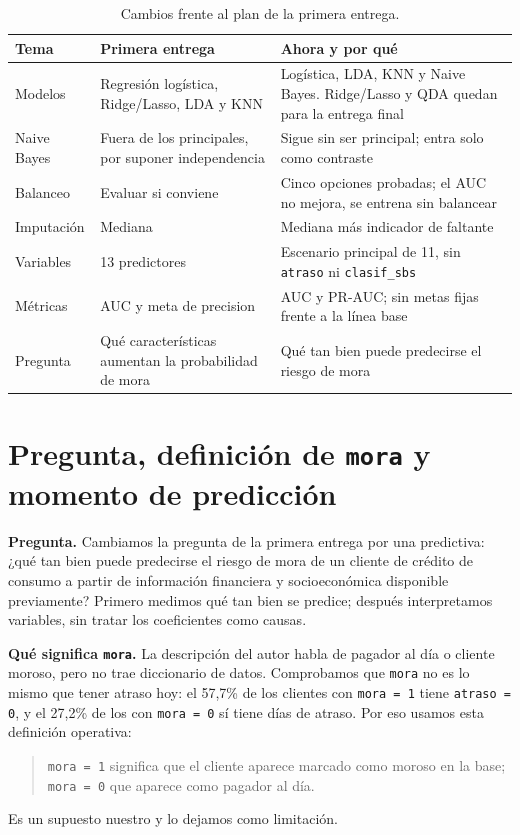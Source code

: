 \documentclass[11pt,a4paper]{article}
\begin{document}
\begin{table}[H]
  \centering
  \caption{Cambios frente al plan de la primera entrega.}
  \label{tab:cambios}
  \small
  \begin{tabular}{@{}p{2.2cm}p{4.2cm}p{6.8cm}@{}}
    \toprule
    Tema & Primera entrega & Ahora y por qué \\
    \midrule
    Modelos & Regresión logística, Ridge/Lasso, LDA y KNN & Logística, LDA, KNN y Naive Bayes. Ridge/Lasso y QDA quedan para la entrega final \\
    Naive Bayes & Fuera de los principales, por suponer independencia & Sigue sin ser principal; entra solo como contraste \\
    Balanceo & Evaluar si conviene & Cinco opciones probadas; el AUC no mejora, se entrena sin balancear \\
    Imputación & Mediana & Mediana más indicador de faltante \\
    Variables & 13 predictores & Escenario principal de 11, sin \texttt{atraso} ni \texttt{clasif\_sbs} \\
    Métricas & AUC y meta de precision & AUC y PR-AUC; sin metas fijas frente a la línea base \\
    Pregunta & Qué características aumentan la probabilidad de mora & Qué tan bien puede predecirse el riesgo de mora \\
    \bottomrule
  \end{tabular}
\end{table}

\section{Pregunta, definición de \texttt{mora} y momento de predicción}

\textbf{Pregunta.} Cambiamos la pregunta de la primera entrega por una predictiva: ¿qué tan bien puede predecirse el riesgo de mora de un cliente de crédito de consumo a partir de información financiera y socioeconómica disponible previamente? Primero medimos qué tan bien se predice; después interpretamos variables, sin tratar los coeficientes como causas.

\textbf{Qué significa \texttt{mora}.} La descripción del autor habla de pagador al día o cliente moroso, pero no trae diccionario de datos. Comprobamos que \texttt{mora} no es lo mismo que tener atraso hoy: el 57,7\% de los clientes con \texttt{mora = 1} tiene \texttt{atraso = 0}, y el 27,2\% de los con \texttt{mora = 0} sí tiene días de atraso. Por eso usamos esta definición operativa:
\begin{quote}
\texttt{mora = 1} significa que el cliente aparece marcado como moroso en la base; \texttt{mora = 0} que aparece como pagador al día.
\end{quote}
Es un supuesto nuestro y lo dejamos como limitación.
\end{document}

